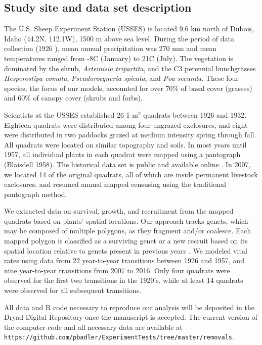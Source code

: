 \documentclass[11pt]{article}
\begin{document}
\begin{doublespacing}
\subsection*{Study site and data set description}

The U.S. Sheep Experiment Station (USSES) is located 9.6 km north of Dubois, Idaho (44.2\degree N, 112.1\degree W), 1500 m above sea level. During the period of data collection (1926 ), mean annual precipitation was 270 mm and mean temperatures ranged from -8\degree C (January) to 21\degree C (July). The vegetation is dominated by the shrub, \textit{Artemisia tripartita}, and the C3  perennial bunchgrasses \textit{Hesperostipa comata}, \textit{Pseudoroegneria spicata},  and \textit{Poa secunda}. These four species, the focus of our models, accounted for over 70\% of basal cover (grasses) and 60\% of canopy cover (shrubs and forbs). 

Scientists at the USSES established 26 1-m$^2$ quadrats between 1926 and 1932. Eighteen quadrats were distributed among four ungrazed exclosures, and eight were distributed in two paddocks grazed at medium intensity spring through fall. All quadrats were located on similar topography and soils. In most years until 1957, all individual plants in each quadrat were mapped using a pantograph (Blaisdell 1958). The historical data set is public and available online \citep{zachmann_mapped_2010}. In 2007, we located 14 of the original quadrats, all of which are inside permanent livestock exclosures, and resumed annual mapped censusing using the traditional pantograph method. 

We extracted data on survival, growth, and recruitment from the mapped quadrats based on plants' spatial locations. Our approach tracks genets, which may be composed of multiple polygons, as they fragment and/or coalesce. Each mapped polygon is classified as a surviving genet or a new recruit based on its spatial location relative to genets present in previous years \citep{lauenroth_demography_2008}. We modeled vital rates using data from 22 year-to-year transitions between 1926 and 1957, and nine year-to-year transitions from 2007 to 2016. Only four quadrats were observed for the first two transitions in the 1920's, while at least 14 quadrats were observed for all subsequent transitions. 

All data and R code necessary to reproduce our analysis will be deposited in the Dryad Digital Repository once the manuscript is accepted. The current version of the computer code and all necessary data are available at \texttt{https://github.com/pbadler/ExperimentTests/tree/master/removals}.


\end{doublespacing}
\end{document}
